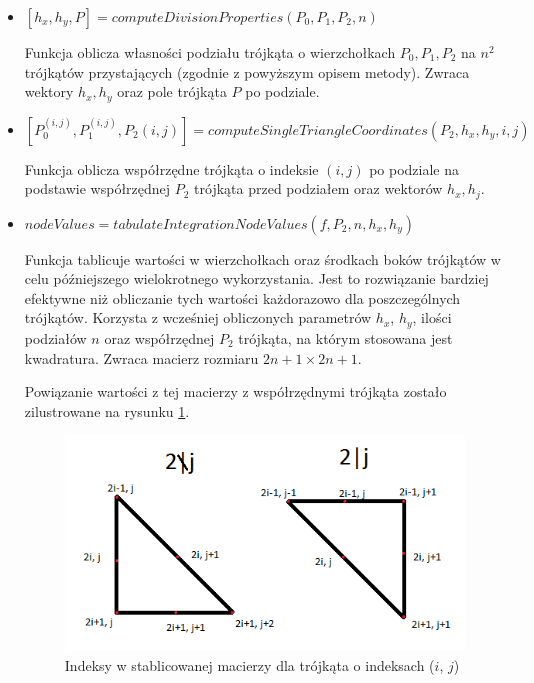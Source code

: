 \documentclass[12pt]{article}
\begin{document}
	\begin{itemize}
		\item $[h_x, h_y, P] = computeDivisionProperties(P_0, P_1, P_2, n)$
		
		Funkcja oblicza własności podziału trójkąta o wierzchołkach $P_0, P_1, P_2$ na $n^2$ trójkątów przystających (zgodnie z powyższym opisem metody). Zwraca wektory $h_x, h_y$ oraz pole trójkąta $P$ po podziale.
		
		
		\item $[P_0^{(i,j)}, P_1^{(i,j)}, P_2{(i,j)}] = computeSingleTriangleCoordinates(P_2, h_x, h_y, i, j)$
		
		Funkcja oblicza współrzędne trójkąta o indeksie $(i, j)$ po podziale na podstawie współrzędnej $P_2$ trójkąta przed podziałem oraz wektorów $h_x, h_j$.
		
		\item $nodeValues = tabulateIntegrationNodeValues(f, P_2, n, h_x, h_y)$
		
		Funkcja tablicuje wartości w wierzchołkach oraz środkach boków trójkątów w celu późniejszego wielokrotnego wykorzystania. Jest to rozwiązanie bardziej efektywne niż obliczanie tych wartości każdorazowo dla poszczególnych trójkątów. Korzysta z wcześniej obliczonych parametrów $h_x$, $h_y$, ilości podziałów $n$ oraz współrzędnej $P_2$ trójkąta, na którym stosowana jest kwadratura. Zwraca macierz rozmiaru $2n+1 \times 2n+1$.
		
		Powiązanie wartości z tej macierzy z współrzędnymi trójkąta zostało zilustrowane na rysunku \ref{triangle-nodes}.
		
		\begin{figure}[H]
			\centering
			\includegraphics[]{images/triangle-nodes.png}
			\caption{Indeksy w stablicowanej macierzy dla trójkąta o indeksach ($i$, $j$)}
			\label{triangle-nodes}
		\end{figure}
		

\end{itemize}
\end{document}
